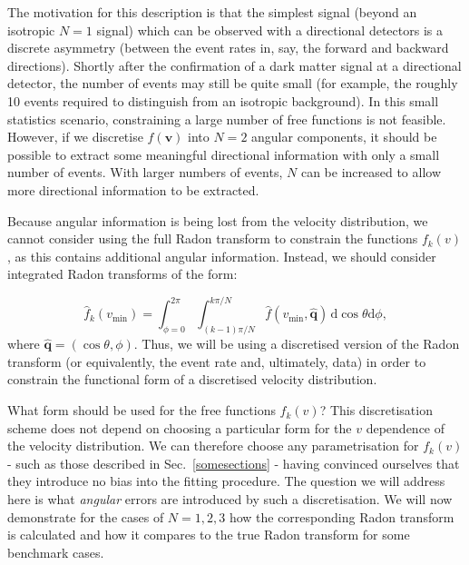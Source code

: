 The motivation for this description is that the simplest signal (beyond an isotropic $N=1$ signal) which can be observed with a directional detectors is a discrete asymmetry (between the event rates in, say, the forward and backward directions). Shortly after the confirmation of a dark matter signal at a directional detector, the number of events may still be quite small (for example, the roughly 10 events required to distinguish from an isotropic background). In this small statistics scenario, constraining a large number of free functions is not feasible. However, if we discretise $f(\textbf{v})$ into $N=2$ angular components, it should be possible to extract some meaningful directional information with only a small number of events. With larger numbers of events, $N$ can be increased to allow more directional information to be extracted. 

Because angular information is being lost from the velocity distribution, we cannot consider using the full Radon transform to constrain the functions $f_k(v)$, as this contains additional angular information. Instead, we should consider integrated Radon transforms of the form:

\begin{equation}
\hat{f}_k(v_\textrm{min}) = \int_{\phi = 0}^{2\pi} \int_{(k-1)\pi/N}^{k\pi/N} \hat{f}(v_\textrm{min}, \hat{\textbf{q}})\, \mathrm{d}\cos\theta\mathrm{d}\phi,
\end{equation}
 where $\hat{\textbf{q}} = (\cos\theta, \phi)$. Thus, we will be using a discretised version of the Radon transform (or equivalently, the event rate and, ultimately, data) in order to constrain the functional form of a discretised velocity distribution. 

What form should be used for the free functions $f_k(v)$? This discretisation scheme does not depend on choosing a particular form for the $v$ dependence of the velocity distribution. We can therefore choose any parametrisation for $f_k(v)$ - such as those described in Sec.~\ref{somesections} - having convinced ourselves that they introduce no bias into the fitting procedure. The question we will address here is what \textit{angular} errors are introduced by such a discretisation. We will now demonstrate for the cases of $N=1, 2, 3$ how the corresponding Radon transform is calculated and how it compares to the true Radon transform for some benchmark cases.

